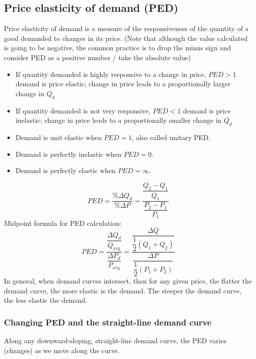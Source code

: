\subsection{Price elasticity of demand (PED)}
Price elasticity of demand is a measure of the responsiveness of the quantity of a good demanded to changes in its price. (Note that although the value calculated is going to be negative, the common practice is to drop the minus sign and consider PED as a positive number / take the absolute value)
\begin{itemize}
  \item If quantity demanded is highly responsive to a change in price, $PED>1$ demand is price elastic; change in price leads to a proportionally larger change in $Q_d$
  \item If quantity demanded is not very responsive, $PED<1$ demand is price inelastic; change in price leads to a proportionally smaller change in $Q_d$
  \item Demand is unit elastic when $PED=1$, also called unitary PED.
  \item Demand is perfectly inelastic when $PED=0$.
  \item Demand is perfectly elastic when $PED=\infty$.
\end{itemize}
\[PED=\dfrac{\%\Delta Q_d}{\%\Delta P}=\dfrac{\dfrac{Q_2-Q_1}{Q_1}}{\dfrac{P_2-P_1}{P_1}}\]
Midpoint formula for PED calculation:
\[PED=\dfrac{\dfrac{\Delta Q_d}{Q_\text{avg}}}{\dfrac{\Delta P_d}{P_\text{avg}}}=\dfrac{\dfrac{\Delta Q}{\dfrac{1}{2}(Q_1+Q_2)}}{\dfrac{\Delta P}{\dfrac{1}{2}(P_1+P_2)}}\]
In general, when demand curves intersect, then for any given price, the flatter the demand curve, the more elastic is the demand. The steeper the demand curve, the less elastic the demand.
\subsubsection*{Changing PED and the straight-line demand curve}
Along any downward-sloping, straight-line demand curve, the PED varies (changes) as we move along the curve.

